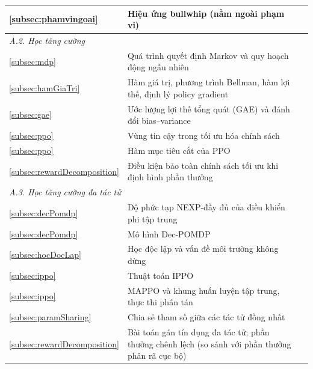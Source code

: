\begin{longtable}{|p{}|p{}|p{}|}
\ref{subsec:phamvingoai} & Hiệu ứng bullwhip (nằm ngoài phạm vi) &
\textcite{lee1997} \\
\hline

\multicolumn{3}{l}{\textit{A.2. Học tăng cường}} \\
\hline
\ref{subsec:mdp} & Quá trình quyết định Markov và quy hoạch động ngẫu nhiên &
\textcite{puterman1994} \\

\ref{subsec:hamGiaTri} & Hàm giá trị, phương trình Bellman, hàm lợi thế, định lý policy gradient &
\textcite{sutton2018} \\

\ref{subsec:gae} & Ước lượng lợi thế tổng quát (GAE) và đánh đổi bias--variance &
\textcite{schulman2016gae} \\

\ref{subsec:ppo} & Vùng tin cậy trong tối ưu hóa chính sách &
\textcite{schulman2015trpo} \\

\ref{subsec:ppo} & Hàm mục tiêu cắt của PPO &
\textcite{schulman2017ppo} \\

\ref{subsec:rewardDecomposition} & Điều kiện bảo toàn chính sách tối ưu khi định hình phần thưởng &
\textcite{ng1999} \\
\hline

\multicolumn{3}{l}{\textit{A.3. Học tăng cường đa tác tử}} \\
\hline
\ref{subsec:decPomdp} & Độ phức tạp NEXP-đầy đủ của điều khiển phi tập trung &
\textcite{bernstein2002} \\

\ref{subsec:decPomdp} & Mô hình Dec-POMDP &
\textcite{oliehoek2016} \\

\ref{subsec:hocDocLap} & Học độc lập và vấn đề môi trường không dừng &
\textcite{tan1993} \\

\ref{subsec:ippo} & Thuật toán IPPO &
\textcite{dewitt2020ippo} \\

\ref{subsec:ippo} & MAPPO và khung huấn luyện tập trung, thực thi phân tán &
\textcite{yu2022mappo} \\

\ref{subsec:paramSharing} & Chia sẻ tham số giữa các tác tử đồng nhất &
\textcite{gupta2017} \\

\ref{subsec:rewardDecomposition} & Bài toán gán tín dụng đa tác tử; phần thưởng chênh lệch (so sánh với phần thưởng phân rã cục bộ) &
\textcite{wolpert2001} \\
\hline


\end{longtable}
